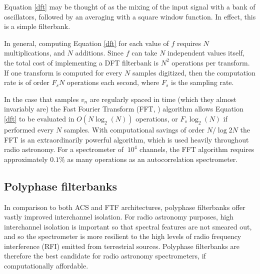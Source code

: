 \documentclass{ws-rv961x669}
\begin{document}
Equation \ref{dft} may be thought of as the mixing of the input signal with a bank of oscillators, followed by an averaging with a square window function. In effect, this is a simple filterbank.

In general, computing Equation \ref{dft} for each value of $f$ requires $N$ multiplications, and $N$ additions. Since $f$ can take $N$ independent values itself, the total cost of implementing a DFT filterbank is $N^2$ operations per transform. If one transform is computed for every $N$ samples digitized, then the computation rate is of order $F_sN$ operations each second, where $F_s$ is the sampling rate.

In the case that samples $v_n$ are regularly spaced in time (which they almost invariably are) the Fast Fourier Transform (FFT, \cite{Cooley1965}) algorithm allows Equation \ref{dft} to be evaluated in $O(N\log_2(N))$ operations, or $F_s\log_2(N)$ if performed every $N$ samples. With computational savings of order $N / \log2{N}$ the FFT is an extraordinarily powerful algorithm, which is used heavily throughout radio astronomy. For a spectrometer of $~10^4$ channels, the FFT algorithm requires approximately $0.1\%$ as many operations as an autocorrelation spectrometer.







\subsection{Polyphase filterbanks}\label{sub:pfb}

In comparison to both ACS and FTF architectures, polyphase filterbanks offer vastly improved interchannel isolation. For radio astronomy
purposes, high interchannel isolation is important so that spectral features are not smeared out, and so the spectrometer is more resilient to the high levels of radio frequency interference (RFI) emitted from terrestrial sources. Polyphase filterbanks are therefore the best candidate for radio astronomy spectrometers, if computationally affordable.
\end{document}
